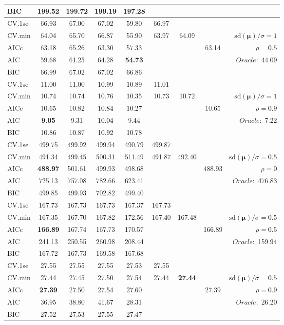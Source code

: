\begin{table}
\begin{center}
\begin{tabular}{l*{7}{c}|r}
BIC & 199.52 & 199.72 & 199.19 & 197.28 & & & &  \\
 \hline 
CV.1se & 66.93 & 67.00 & 67.02 & 59.80 & 66.97 & & & \\
CV.min & 64.04 & 65.70 & 66.87 & 55.90 & 63.97 & 64.09 & & $\mathrm{sd}(\mathbf{\mu})/\sigma=1$ \\
AICc & 63.18 & 65.26 & 63.30 & 57.33 & & & 63.14 &  $\rho=0.5$ \\
AIC & 59.68 & 61.25 & 64.28 & {\bf 54.73} & & & &  \multirow{2}{*}{$Oracle: $ 44.09} \\
BIC & 66.99 & 67.02 & 67.02 & 66.86 & & & &  \\
 \hline 
CV.1se & 11.00 & 11.00 & 10.99 & 10.89 & 11.01 & & & \\
CV.min & 10.74 & 10.74 & 10.76 & 10.35 & 10.73 & 10.72 & & $\mathrm{sd}(\mathbf{\mu})/\sigma=1$ \\
AICc & 10.65 & 10.82 & 10.84 & 10.27 & & & 10.65 &  $\rho=0.9$ \\
AIC & {\bf 9.05} & 9.31 & 10.04 & 9.44 & & & &  \multirow{2}{*}{$Oracle: $ 7.22} \\
BIC & 10.86 & 10.87 & 10.92 & 10.78 & & & &  \\
 \hline 
CV.1se & 499.75 & 499.92 & 499.94 & 490.79 & 499.87 & & & \\
CV.min & 491.34 & 499.45 & 500.31 & 511.49 & 491.87 & 492.40 & & $\mathrm{sd}(\mathbf{\mu})/\sigma=0.5$ \\
AICc & {\bf 488.97} & 501.61 & 499.93 & 498.68 & & & 488.93 &  $\rho=0$ \\
AIC & 725.13 & 757.08 & 782.66 & 623.41 & & & &  \multirow{2}{*}{$Oracle: $ 476.83} \\
BIC & 499.85 & 499.93 & 702.82 & 499.40 & & & &  \\
 \hline 
CV.1se & 167.73 & 167.73 & 167.73 & 167.37 & 167.73 & & & \\
CV.min & 167.35 & 167.70 & 167.82 & 172.56 & 167.40 & 167.48 & & $\mathrm{sd}(\mathbf{\mu})/\sigma=0.5$ \\
AICc & {\bf 166.89} & 167.74 & 167.73 & 170.57 & & & 166.89 &  $\rho=0.5$ \\
AIC & 241.13 & 250.55 & 260.98 & 208.44 & & & &  \multirow{2}{*}{$Oracle: $ 159.94} \\
BIC & 167.72 & 167.73 & 169.58 & 167.68 & & & &  \\
 \hline 
CV.1se & 27.55 & 27.55 & 27.55 & 27.53 & 27.55 & & & \\
CV.min & 27.44 & 27.45 & 27.50 & 27.54 & 27.44 & {\bf 27.44} & & $\mathrm{sd}(\mathbf{\mu})/\sigma=0.5$ \\
AICc & {\bf 27.39} & 27.50 & 27.54 & 27.60 & & & 27.39 &  $\rho=0.9$ \\
AIC & 36.95 & 38.80 & 41.67 & 28.31 & & & &  \multirow{2}{*}{$Oracle: $ 26.20} \\
BIC & 27.52 & 27.53 & 27.55 & 27.47 & & & &  \\
 \hline 
\end{tabular}
\end{center}
\vspace{-1cm}
\end{table}




